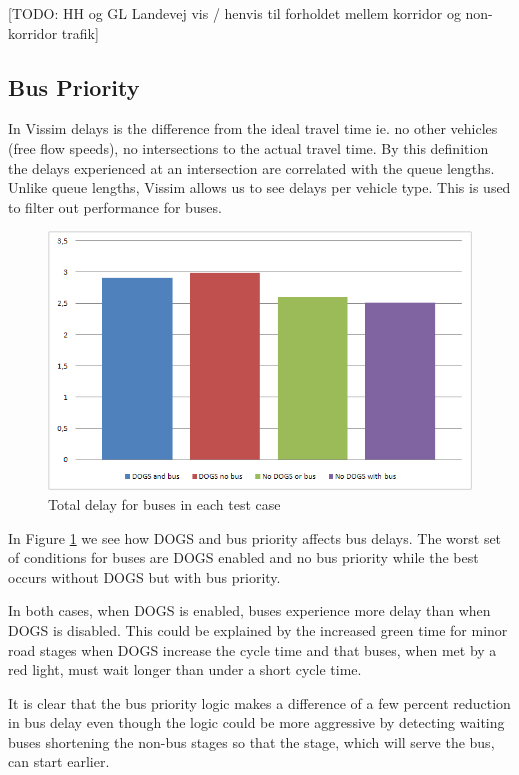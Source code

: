 [TODO: HH og GL Landevej vis / henvis til forholdet mellem korridor og non-korridor trafik]

\subsection*{Bus Priority}
In Vissim delays is the difference from the ideal travel time ie. no other vehicles (free flow speeds), no intersections to the actual travel time. 
By this definition the delays experienced at an intersection are correlated with the queue lengths. Unlike queue lengths, Vissim allows us to see delays per vehicle type. This is used to filter out performance for buses.

\begin{figure}[ht]
\begin{center}
\includegraphics[scale=0.40]{delay_bus.PNG} 
\end{center}
\caption{Total delay for buses in each test case}
\label{fig:bus_delay}
\end{figure}

In Figure \ref{fig:bus_delay} we see how DOGS and bus priority affects bus delays. The worst set of conditions for buses are DOGS enabled and no bus priority while the best occurs without DOGS but with bus priority. 

In both cases, when DOGS is enabled, buses experience more delay than when DOGS is disabled. This could be explained by the increased green time for minor road stages when DOGS increase the cycle time and that buses, when met by a red light, must wait longer than  under a short cycle time.

It is clear that the bus priority logic makes a difference of a few percent reduction in bus delay even though the logic could be more aggressive by detecting waiting buses shortening the non-bus stages so that the stage, which will serve the bus, can start earlier.

